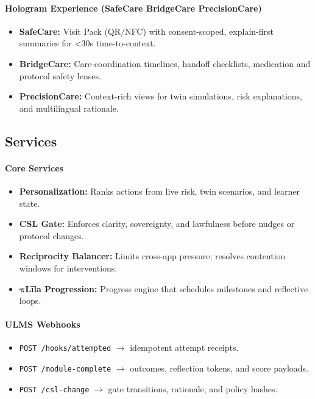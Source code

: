 \documentclass[11pt]{article}
\theoremstyle{plain}
\begin{document}
\paragraph{Hologram Experience (SafeCare \textrightarrow{} BridgeCare \textrightarrow{} PrecisionCare)}
\begin{itemize}
  \item \textbf{SafeCare:} Visit Pack (QR/NFC) with consent-scoped, explain-first summaries for <30s time-to-context.
  \item \textbf{BridgeCare:} Care-coordination timelines, handoff checklists, medication and protocol safety lenses.
  \item \textbf{PrecisionCare:} Context-rich views for twin simulations, risk explanations, and multilingual rationale.
\end{itemize}

\subsection{Services}
\paragraph{Core Services}
\begin{itemize}
  \item \textbf{Personalization:} Ranks actions from live risk, twin scenarios, and learner state.
  \item \textbf{CSL Gate:} Enforces clarity, sovereignty, and lawfulness before nudges or protocol changes.
  \item \textbf{Reciprocity Balancer:} Limits cross-app pressure; resolves contention windows for interventions.
  \item \(\boldsymbol{\pi}\)\textbf{Līla Progression:} Progress engine that schedules milestones and reflective loops.
\end{itemize}

\paragraph{ULMS Webhooks}
\begin{itemize}
  \item \texttt{POST /hooks/attempted} \(\rightarrow\) idempotent attempt receipts.
  \item \texttt{POST /module-complete} \(\rightarrow\) outcomes, reflection tokens, and score payloads.
  \item \texttt{POST /csl-change} \(\rightarrow\) gate transitions, rationale, and policy hashes.
\end{itemize}
\end{document}
